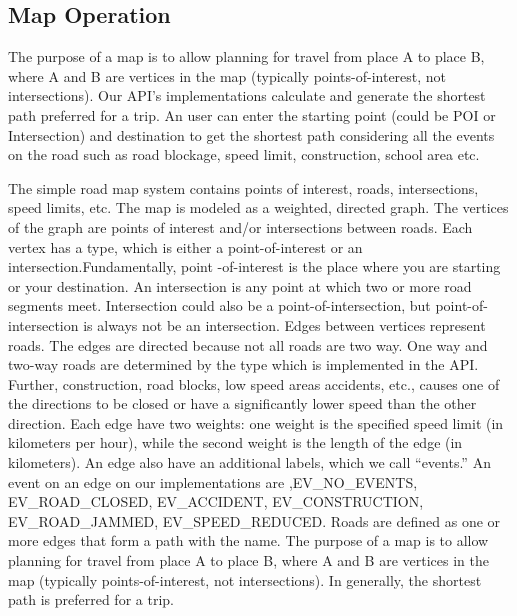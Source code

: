 \documentclass[10pt]{article}
\begin{document}
\subsection{Map Operation} 
The purpose of a map is to allow planning for travel from place A to place B, where A and B are
vertices in the map (typically points-of-interest, not intersections). Our API's implementations calculate and generate the shortest path preferred for a trip. An user can enter the starting point (could be POI or Intersection) and destination to get the shortest path considering all the events on the road such as road blockage, speed limit, construction, school area etc.

The simple road map system contains points of interest, roads, intersections, speed limits, etc. The
map is modeled as a weighted, directed graph. The vertices of the graph are points of interest
and/or intersections between roads. Each vertex has a type, which is either a
point-of-interest or an intersection.Fundamentally, point -of-interest is the place where you are starting or your destination. An intersection is any point at which two or more road segments meet. Intersection could also be a point-of-intersection, but point-of-intersection is always not be an intersection.  Edges between vertices represent roads. The edges are directed because not all roads are two way. One way and two-way roads are determined by the type which is implemented in the API. Further, construction, road blocks, low speed areas accidents, etc., causes one of the directions to be closed or have a significantly lower speed than the other direction. Each edge have two weights: one weight is the specified speed limit (in kilometers per hour), while the second weight is the length of the edge (in kilometers). An edge also have an additional labels, which we call “events.” An event on an edge on our implementations are ,EV\_NO\_EVENTS, EV\_ROAD\_CLOSED, EV\_ACCIDENT, EV\_CONSTRUCTION, EV\_ROAD\_JAMMED, EV\_SPEED\_REDUCED. Roads are defined as one or more edges that form a path with the name.
The purpose of a map is to allow planning for travel from place A to place B, where A and B are
vertices in the map (typically points-of-interest, not intersections). In generally, the shortest path
is preferred for a trip.
\end{document}
